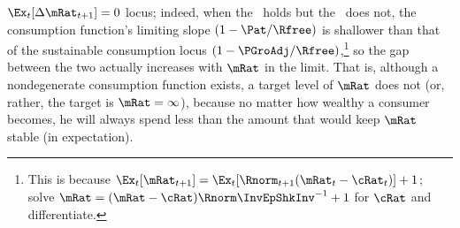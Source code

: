 \documentclass[./BufferStockTheory.tex]{subfiles}
\begin{document}
$\Ex_{t}[\Delta \mRat_{t+1}]=0$ locus; indeed, when the \RIC~holds but
the \GIC~does not, the consumption function's limiting slope
$(1-\Pat/\Rfree)$ is shallower than that of the sustainable consumption
locus $(1-\PGroAdj/\Rfree)$,\footnote{This is because
    $\Ex_{t}[\mRat_{t+1}]=\Ex_{t}[\Rnorm_{t+1}(\mRat_{t}-\cRat_{t})]+1$; solve $\mRat = (\mRat - \cRat)\Rnorm \InvEpShkInv^{-1}+1$ for $\cRat$ and differentiate.}
  so the gap between the two actually increases with $\mRat$ in the
  limit.  That is, although a nondegenerate consumption function
  exists, a target level of $\mRat$ does not (or, rather, the
  target is $\mRat=\infty$), because no matter how wealthy a consumer
  becomes, he will always spend less than the amount that
  would keep $\mRat$ stable (in expectation).

\renewcommand{\figFile}{FVACnotGIC}
\hypertarget{\figFile}{}


\begin{comment}
The foregoing has some connection with the theoretical results in
Szeidl~\citeyearpar{szeidlInvariant}, who shows that the condition we
call the \GIC~guarantees that $\mRat$ will have an asymptotically
bounded mean.  He also shows that under these circumstances $\mRat$
satisfies conditions he proves to be necessary for the existence of a
stable invariant distribution.  Furthermore, $\aRat$, $\bRat$, and $\cRat$
are also shown to have stable invariant distributions and asymptotically
bounded means.  We make use of these results below.
\end{comment}

\begin{comment} %
A final point worth reemphasizing is that neither the Return
Impatience Condition nor the Finite Human Wealth Condition was
required for the contraction mapping proof.  Both these conditions are
necessary for a nondegenerate solution to exist in the unconstrained
perfect foresight case.  This is noteworthy because in some models and
in many economists' intuition, the introduction of uncertainty reduces
the space of parameter values for which a unique solution exists;
here, precisely the opposite occurs.  Indeed, many of the
parameterizations newly eligible for solution are quite plausible, so
this observation is not merely a curiosum but of real practical
value.\footnote{An easy example of a case where the perfect foresight
  model has no solution is where $\Rfree >1$, $\DiscFac = 1/\Rfree$
  and $\PGro > \Rfree$.}
\end{comment}
\end{document}
